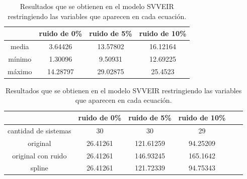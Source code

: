 \begin{table}[!h]
    \centering
    \caption{Resultados que se obtienen en el modelo SVVEIR restringiendo las variables que aparecen en cada ecuación.}
    \begin{tabular}{|c|c|c|c|}
        \hline
               & \textbf{ruido de 0\%} & \textbf{ruido de 5\%} & \textbf{ruido de 10\%} \\
        \hline
        media  & 3.64426               & 13.57802              & 16.12164               \\
        \hline
        mínimo & 1.30096               & 9.50931               & 12.69225               \\
        \hline
        máximo & 14.28797              & 29.02875              & 25.4523                \\
        \hline
    \end{tabular}

    \begin{tabular}{|c|c|c|c|c|c|}
        \hline
                             & \textbf{ruido de 0\%} & \textbf{ruido de 5\%} & \textbf{ruido de 10\%} \\
        \hline
        cantidad de sistemas & 30                    & 30                    & 29                     \\
        \hline
        original             & 26.41261              & 121.61259             & 94.25209               \\
        \hline
        original con ruido   & 26.41261              & 146.93245             & 165.1642               \\
        \hline
        spline               & 26.41261              & 121.72339             & 94.75343               \\
        \hline
    \end{tabular}
    \label{table:experiment_SVVEIR}
\end{table}

